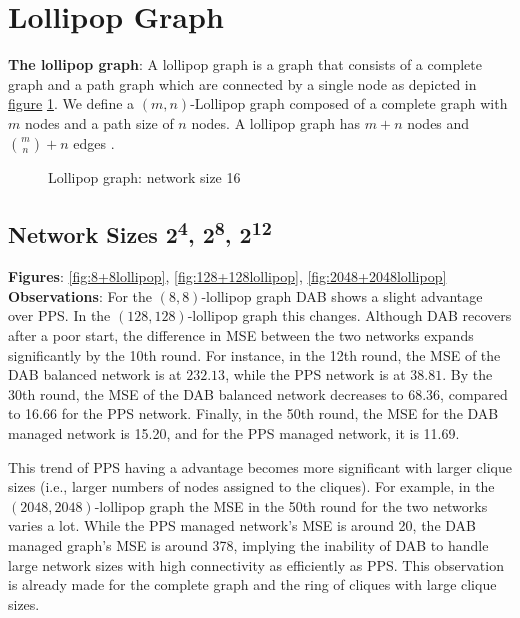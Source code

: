 \section{Lollipop Graph}
\textbf{The lollipop graph}: A lollipop graph is a graph that consists of a complete graph and a path graph which are connected by a single node as depicted in \hyperref[fig:lollipopgraphDemo]{figure} \ref{fig:lollipopgraphDemo}. We define a $(m, n)$-Lollipop graph composed of a complete graph with $m$ nodes and a path size of $n$ nodes. A lollipop graph has $m+n$ nodes and $\binom{m}{n}+n$ edges \cite{JonassonLollipopGraphs2000}.
\begin{figure}[H]
    \centering
    \scalebox{1}{}
    \caption{Lollipop graph: network size 16}
    \label{fig:lollipopgraphDemo}
\end{figure}

\subsection{Network Sizes 2\textsuperscript{4}, 2\textsuperscript{8}, 2\textsuperscript{12}}
\textbf{Figures}: \ref{fig:8+8lollipop}, \ref{fig:128+128lollipop}, \ref{fig:2048+2048lollipop}\\
\textbf{Observations}: For the $(8, 8)$-lollipop graph DAB shows a slight advantage over PPS. In the $(128, 128)$-lollipop graph this changes. Although DAB recovers after a poor start, the difference in MSE between the two networks expands significantly by the 10th round. For instance, in the 12th round, the MSE of the DAB balanced network is at $232.13$, while the PPS network is at $38.81$. By the 30th round, the MSE of the DAB balanced network decreases to 68.36, compared to 16.66 for the PPS network. Finally, in the 50th round, the MSE for the DAB managed network is 15.20, and for the PPS managed network, it is 11.69.

This trend of PPS having a advantage becomes more significant with larger clique sizes (i.e., larger numbers of nodes assigned to the cliques). For example, in the $(2048, 2048)$-lollipop graph the MSE in the 50th round for the two networks varies a lot. While the PPS managed network's MSE is around 20, the DAB managed graph's MSE is around 378, implying the inability of DAB to handle large network sizes with high connectivity as efficiently as PPS. This observation is already made for the complete graph and the ring of cliques with large clique sizes.

